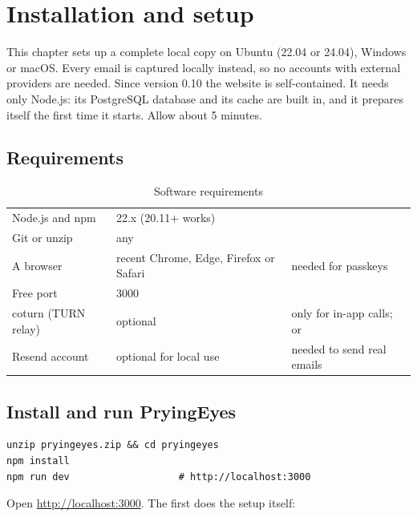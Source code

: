 \chapter{Installation and setup}
\label{ch:setup}

This chapter sets up a complete local copy on Ubuntu (22.04 or 24.04), Windows or macOS. Every email is captured locally instead, so no accounts with external providers are needed. Since version 0.10 the website is self-contained. It needs only Node.js: its PostgreSQL database and its cache are built in, and it prepares itself the first time it starts. Allow about 5 minutes.

\section{Requirements}

\begin{table}[H]
\centering\small
\caption{Software requirements}\label{tab:reqs}
\begin{tabularx}{\linewidth}{@{}L{3.4cm}L{2.6cm}Y@{}}
\toprule
{} &  &  \\
\midrule
Node.js and npm & 22.x (20.11+ works) &  \\
Git or unzip & any & \\
A browser & recent Chrome, Edge, Firefox or Safari & needed for passkeys \\
Free port & 3000 & \\
coturn (TURN relay) & optional & only for in-app calls;  or  \\
Resend account & optional for local use & needed to send real emails \\
\bottomrule
\end{tabularx}
\end{table}

\section{Install and run PryingEyes}

\begin{lstlisting}
unzip pryingeyes.zip && cd pryingeyes
npm install
npm run dev                   # http://localhost:3000
\end{lstlisting}

Open \url{http://localhost:3000}. The first  does the setup itself:

